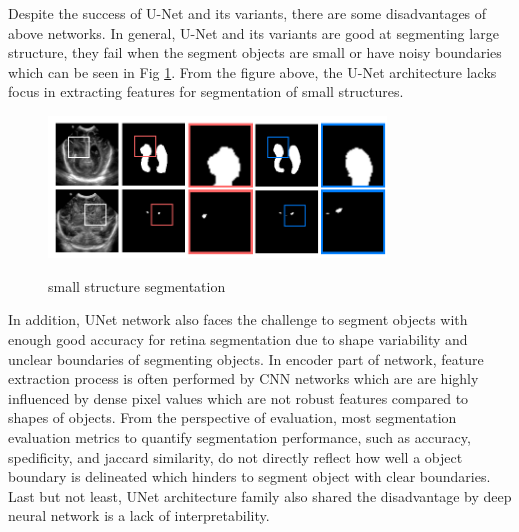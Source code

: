 \documentclass{ieeeaccess}
\begin{document}
  Despite the success of U-Net and its variants,  there are some disadvantages of above networks. In general, U-Net and its variants are good at segmenting large structure, they fail when the segment objects are small or have noisy boundaries which can be seen in Fig \ref{fig:segment_small_structures}. From the figure above, the U-Net architecture lacks focus in extracting features for segmentation of small structures. 
  \begin{figure}[htbp]
  \small
  \centering
  \includegraphics[width=0.8\textwidth]{figure/segment_small_structures.png}
  \label{fig:segment_small_structures}
  \caption{small structure segmentation}
  \end{figure}
  
  In addition, UNet network also faces the challenge to segment objects with enough good accuracy for retina segmentation due to 
  shape variability and unclear boundaries of segmenting objects. In encoder part of network, feature extraction process is often performed by CNN networks which are are highly influenced by dense pixel values which are not robust features compared to shapes of objects. From the perspective of evaluation,  most segmentation evaluation metrics to quantify segmentation performance, such as accuracy, spedificity, and jaccard similarity, do not directly reflect how well a object boundary is delineated which hinders to segment object with clear boundaries. Last but not least,  UNet architecture family also shared the disadvantage by deep neural network is a lack of interpretability. 
  
\end{document}
